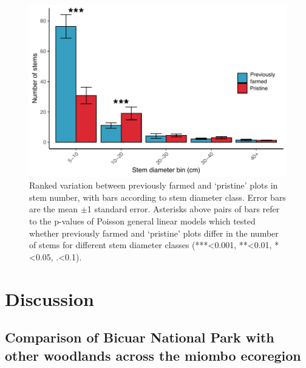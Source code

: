 \begin{refsection}
\begin{landscape}

\end{landscape}

\begin{figure}
	\includegraphics[width=0.8\linewidth]{img/degrad_dbh_bin}
	\caption[Stem diameter class variation among previously farmed and `pristine' plots]{Ranked variation between previously farmed and `pristine' plots in stem number, with bars according to stem diameter class. Error bars are the mean $\pm$1 standard error. Asterisks above pairs of bars refer to the p-values of Poisson general linear models which tested whether previously farmed and `pristine' plots differ in the number of stems for different stem diameter classes (***<0.001, **<0.01, *<0.05, .<0.1).}
	\label{bicuar:degrad_dbh_bin}
\end{figure}


\section{Discussion}
\label{bicuar:sec:discussion}

\subsection{Comparison of Bicuar National Park with other woodlands across the miombo ecoregion}
\label{bicuar:ssec:miombo}


\end{refsection}
